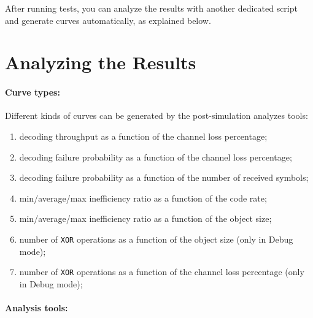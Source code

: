 \documentclass[a4paper,11pt]{article}
\begin{document}
{After running tests, you can analyze the results with another dedicated script and generate
curves automatically, as explained below.




\section{Analyzing the Results}
\begin{flushright}
\end{flushright}

\paragraph{Curve types:}

Different kinds of curves can be generated by the post-simulation analyzes tools:
\begin{enumerate}
\item decoding throughput as a function of the channel loss percentage;
\item decoding failure probability as a function of the channel loss percentage;
\item decoding failure probability as a function of the number of received symbols;
\item min/average/max inefficiency ratio as a function of the code rate;
\item min/average/max inefficiency ratio as a function of the object size;
\item number of \verb+XOR+ operations as a function of the object size (only in Debug mode);
\item number of \verb+XOR+ operations as a function of the channel loss percentage (only in Debug mode);
\end{enumerate}


\paragraph{Analysis tools:}

}
\end{document}
